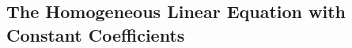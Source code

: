 \vspace{20pt}
\subsection{The Homogeneous Linear Equation with Constant Coefficients}



























